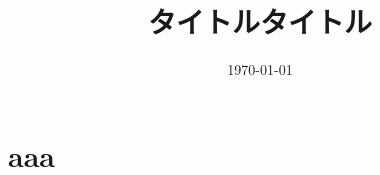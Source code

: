 \documentclass[uplatex,a4paper,11pt]{jsarticle} %
\title{タイトルタイトル}
\date{\today}
\numberwithin{equation}{section}     %
\begin{document}

\section{aaa}






% 
\end{document}
